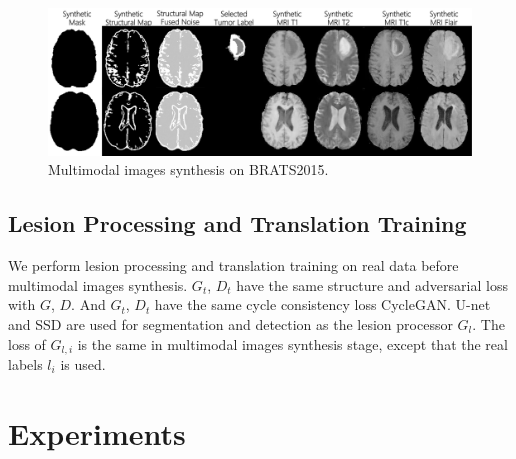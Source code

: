 \documentclass[runningheads]{llncs}
\begin{document}
	\begin{figure}[th]
		\centering
		\includegraphics[width=0.8\linewidth]{figures/F_to_MRI}
		\caption{Multimodal images synthesis on BRATS2015.}
		\label{generated_mri}
	\end{figure}
	\subsection{Lesion Processing and Translation Training}
	We perform lesion processing and translation training on real data before multimodal images synthesis. $G_t$, $D_t$ have the same structure and adversarial loss with $G$, $D$. And $G_t$, $D_t$ have the same cycle consistency loss  CycleGAN\cite{6zhu2017unpaired}.
	U-net and SSD\cite{101liu2016ssd:} are used for segmentation and detection as the lesion processor $G_l$. The loss of $G_{l,i}$ is the same in multimodal images synthesis stage, except that the real labels $l_i$ is used.
	\section{Experiments}
\end{document}
